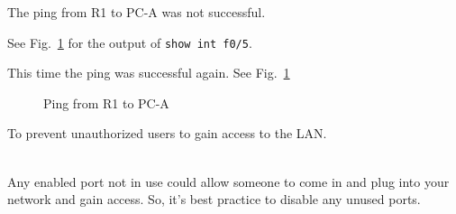\documentclass[../EngineeringJournal_CDavis.tex]{subfiles}
\begin{document}
The ping from R1 to PC-A was not successful. 


See Fig.~\ref{R1ping10} for the output of
{\scriptsize{\verb$show int f0/5$}\normalsize}.


This time the ping was successful again. See
Fig.~\ref{R1ping10}


\begin{figure}[!hbt]\centering
{}\par
{}\par 
{}\par 
\caption{Ping from R1 to PC-A}
\label{R1ping10}
\end{figure}




To prevent unauthorized users to gain access to the LAN.


\noindent{}
\\Any enabled port not in use could allow someone to come in and plug into
your network and gain access. So, it's best practice to disable any unused
ports.

\end{document}
